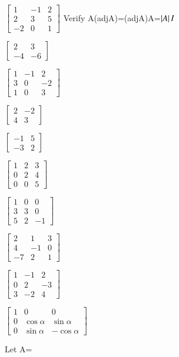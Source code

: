 \item $\begin{bmatrix}
1&-1&2 \\ 2&3&5 \\ -2&0&1
\end{bmatrix}$
Verify A(adjA)=(adjA)A=$\left\vert A\right\vert I$
\item $\begin{bmatrix}
2&3 \\ -4&-6
\end{bmatrix}$
\item $\begin{bmatrix}
1&-1&2 \\ 3&0&-2 \\ 1&0&3
\end{bmatrix}$
\item $\begin{bmatrix}
2&-2 \\ 4&3
\end{bmatrix}$
\item $\begin{bmatrix}
-1&5 \\ -3&2
\end{bmatrix}$
\item $\begin{bmatrix}
1&2&3 \\ 0&2&4 \\ 0&0&5
\end{bmatrix}$
\item $\begin{bmatrix}
1&0&0 \\ 3&3&0 \\ 5&2&-1
\end{bmatrix}$
\item $\begin{bmatrix}
2&1&3 \\ 4&-1&0 \\ -7&2&1
\end{bmatrix}$
\item $\begin{bmatrix}
1&-1&2 \\ 0&2&-3 \\ 3&-2&4
\end{bmatrix}$
\item $\begin{bmatrix}
1&0&0 \\ 0& \cos\alpha &\sin\alpha \\ 0&\sin\alpha&-\cos\alpha
\end{bmatrix}$
\item Let A=
